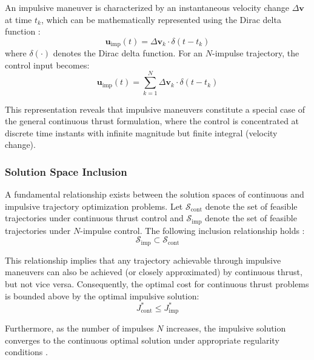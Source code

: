 \documentclass[a4paper,fleqn]{cas-dc}
\begin{document}
An impulsive maneuver is characterized by an instantaneous velocity change $\Delta\mathbf{v}$ at time $t_k$, which can be mathematically represented using the Dirac delta function \citep{Lawden1963}:
\begin{equation}\label{eq:impulse_delta}
\mathbf{u}_{\text{imp}}(t) = \Delta\mathbf{v}_k \cdot \delta(t - t_k)
\end{equation}
where $\delta(\cdot)$ denotes the Dirac delta function. For an $N$-impulse trajectory, the control input becomes:
\begin{equation}\label{eq:n_impulse}
\mathbf{u}_{\text{imp}}(t) = \sum_{k=1}^{N} \Delta\mathbf{v}_k \cdot \delta(t - t_k)
\end{equation}

This representation reveals that impulsive maneuvers constitute a special case of the general continuous thrust formulation, where the control is concentrated at discrete time instants with infinite magnitude but finite integral (velocity change).

\subsubsection{Solution Space Inclusion}

A fundamental relationship exists between the solution spaces of continuous and impulsive trajectory optimization problems. Let $\mathcal{S}_{\text{cont}}$ denote the set of feasible trajectories under continuous thrust control and $\mathcal{S}_{\text{imp}}$ denote the set of feasible trajectories under $N$-impulse control. The following inclusion relationship holds \citep{Taheri2020}:
\begin{equation}\label{eq:solution_space}
\mathcal{S}_{\text{imp}} \subset \mathcal{S}_{\text{cont}}
\end{equation}

This relationship implies that any trajectory achievable through impulsive maneuvers can also be achieved (or closely approximated) by continuous thrust, but not vice versa. Consequently, the optimal cost for continuous thrust problems is bounded above by the optimal impulsive solution:
\begin{equation}
J^*_{\text{cont}} \leq J^*_{\text{imp}}
\end{equation}

Furthermore, as the number of impulses $N$ increases, the impulsive solution converges to the continuous optimal solution under appropriate regularity conditions \citep{Prussing2010}.
\end{document}
